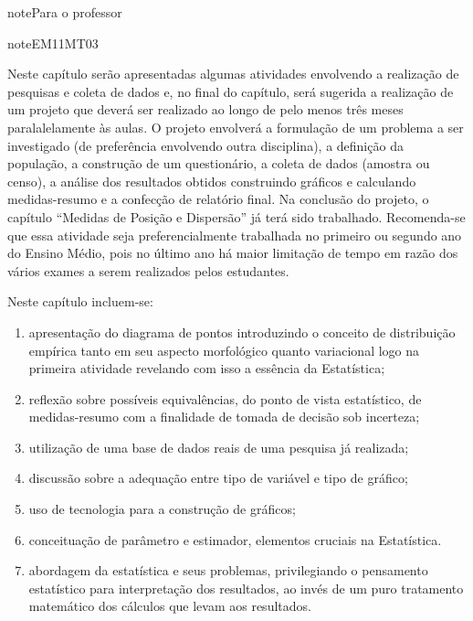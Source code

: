 \begin{sphinxadmonition}{note}{Para o professor}
\begin{sphinxadmonition}{note}{EM11MT03}
\begin{enumerate}
\end{enumerate}

Neste capítulo serão apresentadas algumas atividades envolvendo a realização de pesquisas e coleta de dados e, no final do capítulo, será sugerida a realização de um projeto que deverá ser realizado ao longo de pelo menos três meses paralalelamente às aulas. O projeto envolverá a formulação de um problema a ser investigado (de preferência envolvendo outra disciplina), a definição da população, a construção de um questionário, a coleta de dados (amostra ou censo), a análise dos resultados obtidos construindo gráficos e calculando medidas-resumo e a confecção de relatório final. Na conclusão do projeto, o capítulo ``Medidas de Posição e Dispersão'' já terá sido trabalhado. Recomenda-se que essa atividade seja preferencialmente trabalhada no primeiro ou segundo ano do Ensino Médio, pois no último ano há maior limitação de tempo em razão dos vários exames a serem realizados pelos estudantes.

Neste capítulo incluem-se:
\begin{enumerate}
\item {} 
apresentação do diagrama de pontos introduzindo o conceito de distribuição empírica tanto em seu aspecto morfológico quanto variacional logo na primeira atividade revelando com isso a essência da Estatística;

\item {} 
reflexão sobre possíveis equivalências, do ponto de vista estatístico, de medidas-resumo com a finalidade de tomada de decisão sob incerteza;

\item {} 
utilização de uma base de dados reais de uma pesquisa já realizada;

\item {} 
discussão sobre a adequação entre tipo de variável e tipo de gráfico;

\item {} 
uso de tecnologia para a construção de gráficos;

\item {} 
conceituação de parâmetro e estimador, elementos cruciais na Estatística.

\item {} 
abordagem da estatística e seus problemas, privilegiando o pensamento estatístico para interpretação dos resultados, ao invés de um puro tratamento matemático dos cálculos que levam aos resultados.

\end{enumerate}


\end{sphinxadmonition}
\end{sphinxadmonition}
